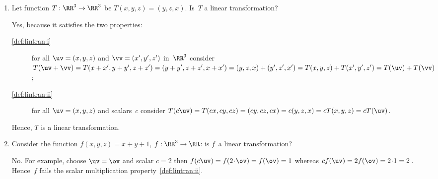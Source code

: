 \begin{activity}
%
%
\end{activity}




\begin{example} \label{eg:}
\begin{enumerate}
\item Let function \(T:\RR^3\to\RR^3\) be \(T(x,y,z)=(y,z,x)\).  
Is~\(T\) a linear transformation?
\begin{solution} 
Yes, because it satisfies the two properties:
\begin{description}
\item[\ref{def:lintran:i}] for all \(\uv=(x,y,z)\) and \(\vv=(x',y',z')\) in~\(\RR^3\) consider \(T(\uv+\vv)
=T(x+x',y+y',z+z')
=(y+y',z+z',x+x')
=(y,z,x)+(y',z',x')
=T(x,y,z)+T(x',y',z')
=T(\uv)+T(\vv)\);

\item[\ref{def:lintran:ii}] for all \(\uv=(x,y,z)\) and scalars~\(c\)
consider \(T(c\uv)
=T(cx,cy,cz)
=(cy,cz,cx)
=c(y,z,x)
=cT(x,y,z)
=cT(\uv)\).
\end{description}
Hence, \(T\) is a linear transformation.
\end{solution}

\item Consider the function \(f(x,y,z)=x+y+1\), \(f:\RR^3\to\RR\): is \(f\)~a linear transformation?
\begin{solution} 
No.  For example, choose \(\uv=\ov\) and scalar \(c=2\) then \(f(c\uv)=f(2\cdot\ov)=f(\ov)=1\) whereas \(cf(\uv)=2f(\ov)=2\cdot 1=2\)\,.
Hence~\(f\) fails the scalar multiplication property~\ref{def:lintran:ii}.
\end{solution}



\end{enumerate}
\end{example}
